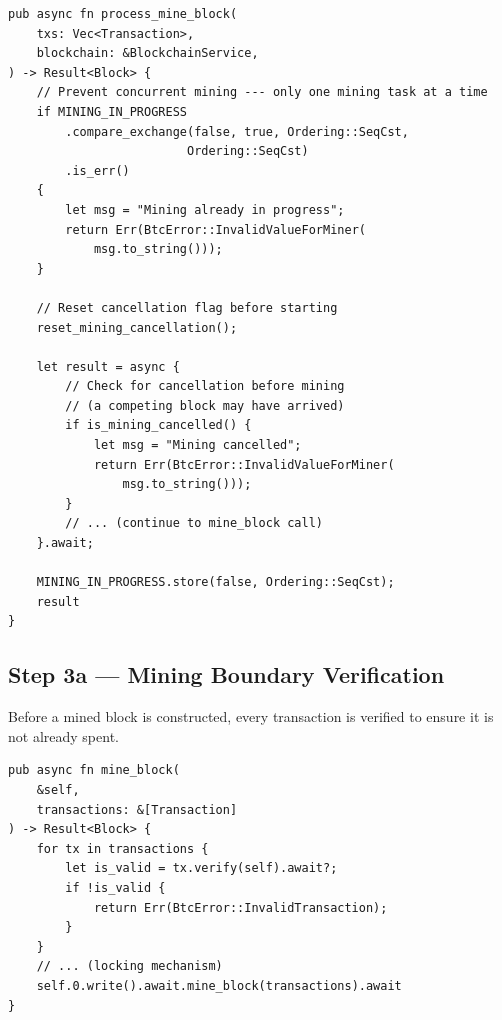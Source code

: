 \begin{listing}[H]
\caption{Mine \textrightarrow\ mempool cleanup \textrightarrow\ announce ()}
\label{lst:9-6-3}
\begin{verbatim}
pub async fn process_mine_block(
    txs: Vec<Transaction>,
    blockchain: &BlockchainService,
) -> Result<Block> {
    // Prevent concurrent mining --- only one mining task at a time
    if MINING_IN_PROGRESS
        .compare_exchange(false, true, Ordering::SeqCst,
                         Ordering::SeqCst)
        .is_err()
    {
        let msg = "Mining already in progress";
        return Err(BtcError::InvalidValueForMiner(
            msg.to_string()));
    }

    // Reset cancellation flag before starting
    reset_mining_cancellation();

    let result = async {
        // Check for cancellation before mining
        // (a competing block may have arrived)
        if is_mining_cancelled() {
            let msg = "Mining cancelled";
            return Err(BtcError::InvalidValueForMiner(
                msg.to_string()));
        }
        // ... (continue to mine_block call)
    }.await;

    MINING_IN_PROGRESS.store(false, Ordering::SeqCst);
    result
}
\end{verbatim}
\end{listing}

\subsection{Step 3a --- Mining Boundary Verification}
\label{sec:ch09-6-step3a}

Before a mined block is constructed, every transaction is verified to ensure it is not already spent.

\begin{listing}[htbp]
\caption{Mining boundary verification ()}
\label{lst:9-6-4}
\begin{verbatim}
pub async fn mine_block(
    &self,
    transactions: &[Transaction]
) -> Result<Block> {
    for tx in transactions {
        let is_valid = tx.verify(self).await?;
        if !is_valid {
            return Err(BtcError::InvalidTransaction);
        }
    }
    // ... (locking mechanism)
    self.0.write().await.mine_block(transactions).await
}
\end{verbatim}
\end{listing}

